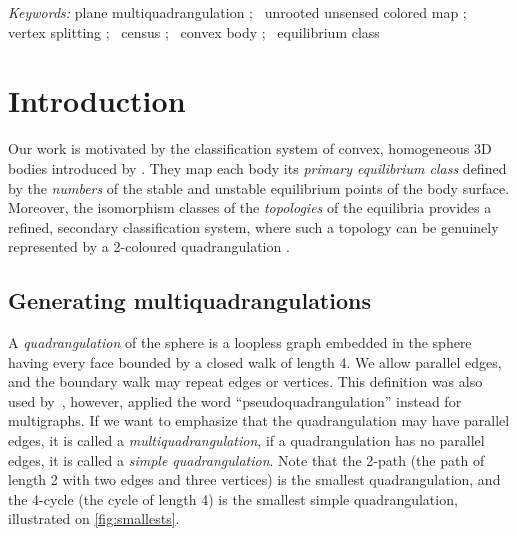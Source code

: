 \documentclass[]{article}
\newenvironment{keyword}{\emph{Keywords: }}{}
\newcommand{\sep}{;\ }
\begin{document}
\begin{keyword}
plane multiquadrangulation
\sep
unrooted unsensed colored map
\sep
vertex splitting
\sep
census
\sep
convex body
\sep
equilibrium class




\end{keyword}






















\section{Introduction}
\label{sec:intro}

Our work is motivated by the classification system of convex, homogeneous 3D bodies introduced by \citet{Domokos2006}.
They map each body its \emph{primary equilibrium class} defined by the \emph{numbers} of the stable and unstable equilibrium points of the body surface.
Moreover, the isomorphism classes of the \emph{topologies} of the equilibria provides a refined, secondary classification system, where such a topology can be genuinely represented by a 2-coloured quadrangulation \cite{Domokos2012}.

\subsection{Generating multiquadrangulations}

A \emph{quadrangulation} of the sphere is a loopless graph embedded in the sphere having every face bounded by a closed walk of length 4.
We allow parallel edges, and the boundary walk may repeat edges or vertices.
This definition was also used by~\citet{Mohar2010}, however, \citet{Archdeacon2001} applied the word ``pseudoquadrangulation'' instead for multigraphs.
If we want to emphasize that the quadrangulation may have parallel edges, it is called a \emph{multiquadrangulation},
if a quadrangulation has no parallel edges, it is called a \emph{simple quadrangulation}.
Note that the 2-path  (the path of length 2 with two edges and three vertices) is the smallest quadrangulation, and the 4-cycle  (the cycle of length 4) is the smallest simple quadrangulation, illustrated on \autoref{fig:smallests}.
\end{document}
